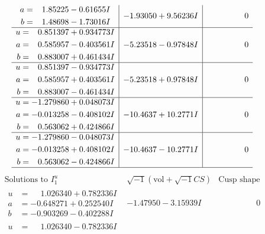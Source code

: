 \documentclass[1p]{elsarticle_modified}
\theoremstyle{definition}
\newcommand{\I}{\sqrt{-1}}
\begin{document}
$$\begin{array}{c|c|c}
\begin{aligned}
a &= \phantom{-}1.85225 - 0.61655 I \\
b &= \phantom{-}1.48698 - 1.73016 I\end{aligned}
 & -1.93050 + 9.56236 I & \phantom{-0.000000 } 0 \\ \hline\begin{aligned}
u &= \phantom{-}0.851397 + 0.934773 I \\
a &= \phantom{-}0.585957 - 0.403561 I \\
b &= \phantom{-}0.883007 + 0.461434 I\end{aligned}
 & -5.23518 - 0.97848 I & \phantom{-0.000000 } 0 \\ \hline\begin{aligned}
u &= \phantom{-}0.851397 - 0.934773 I \\
a &= \phantom{-}0.585957 + 0.403561 I \\
b &= \phantom{-}0.883007 - 0.461434 I\end{aligned}
 & -5.23518 + 0.97848 I & \phantom{-0.000000 } 0 \\ \hline\begin{aligned}
u &= -1.279860 + 0.048073 I \\
a &= -0.013258 - 0.408102 I \\
b &= \phantom{-}0.563062 + 0.424866 I\end{aligned}
 & -10.4637 + 10.2771 I & \phantom{-0.000000 } 0 \\ \hline\begin{aligned}
u &= -1.279860 - 0.048073 I \\
a &= -0.013258 + 0.408102 I \\
b &= \phantom{-}0.563062 - 0.424866 I\end{aligned}
 & -10.4637 - 10.2771 I & \phantom{-0.000000 } 0\\
 \hline 
 \end{array}$$\newpage$$\begin{array}{c|c|c}  
\text{Solutions to }I^u_{1}& \I (\text{vol} + \sqrt{-1}CS) & \text{Cusp shape}\\
 \hline 
\begin{aligned}
u &= \phantom{-}1.026340 + 0.782336 I \\
a &= -0.648271 + 0.252540 I \\
b &= -0.903269 - 0.402288 I\end{aligned}
 & -1.47950 - 3.15939 I & \phantom{-0.000000 } 0 \\ \hline\begin{aligned}
u &= \phantom{-}1.026340 - 0.782336 I \\

\end{aligned}
\end{array}$$
\end{document}

